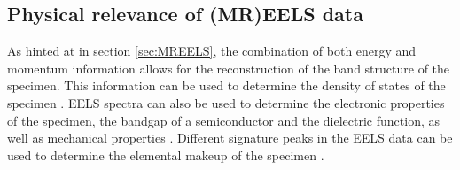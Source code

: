 \subsection{Physical relevance of (MR)EELS data}
As hinted at in section \ref{sec:MREELS}, the combination of both energy and momentum information allows for the reconstruction of the band structure of the specimen. This information can be used to determine the density of states of the specimen \cite{doi:10.1021/acs.nanolett.9b03928} \cite{Egerton_2008}.
EELS spectra can also be used to determine the electronic properties of the specimen, the bandgap of a semiconductor and the dielectric function, as well as mechanical properties \cite{Egerton_2008}.
Different signature peaks in the EELS data can be used to determine the elemental makeup of the specimen \cite{Egerton_2008}.